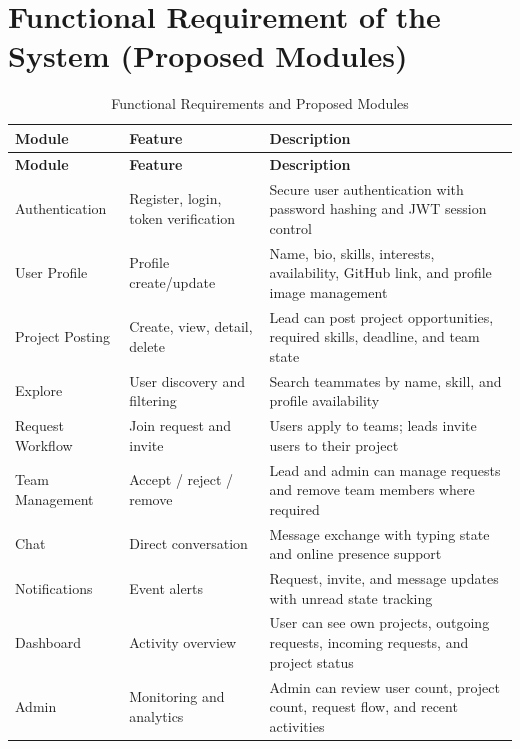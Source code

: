 \documentclass[12pt,a4paper,oneside]{report}
\begin{document}
\section{Functional Requirement of the System (Proposed Modules)}
{\small
\setlength{\tabcolsep}{4pt}
\begin{longtable}{L{0.85in}L{1.45in}L{2.75in}}
\caption{Functional Requirements and Proposed Modules} \\
\toprule
\textbf{Module} & \textbf{Feature} & \textbf{Description} \\
\midrule
\endfirsthead
\toprule
\textbf{Module} & \textbf{Feature} & \textbf{Description} \\
\midrule
\endhead
Authentication & Register, login, token verification & Secure user authentication with password hashing and JWT session control \\
User Profile & Profile create/update & Name, bio, skills, interests, availability, GitHub link, and profile image management \\
Project Posting & Create, view, detail, delete & Lead can post project opportunities, required skills, deadline, and team state \\
Explore & User discovery and filtering & Search teammates by name, skill, and profile availability \\
Request Workflow & Join request and invite & Users apply to teams; leads invite users to their project \\
Team Management & Accept / reject / remove & Lead and admin can manage requests and remove team members where required \\
Chat & Direct conversation & Message exchange with typing state and online presence support \\
Notifications & Event alerts & Request, invite, and message updates with unread state tracking \\
Dashboard & Activity overview & User can see own projects, outgoing requests, incoming requests, and project status \\
Admin & Monitoring and analytics & Admin can review user count, project count, request flow, and recent activities \\
\bottomrule
\end{longtable}
}
\end{document}
